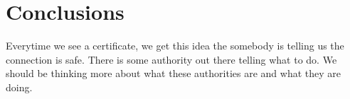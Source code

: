 \chapter{Conclusions \label{conclusions}}
\noindent
Everytime we see a certificate, we get this idea the somebody is telling us the
connection is safe. There is some authority out there telling what to do.
We should be thinking more about what these authorities are and what they are
doing.

